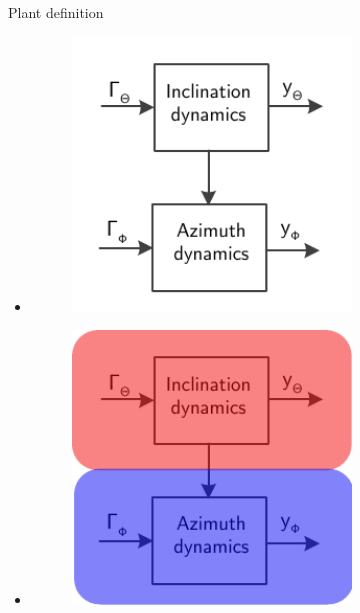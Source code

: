 \documentclass{beamer}
\begin{document}
\begin{frame}{Plant definition}\setlength{\leftmargini}{0pt}
\begin{itemize} 
				\item <1|only@1> [] \begin{figure}[ht]\centering
				\includegraphics[width=0.7\textwidth]{images/Plant.pdf}
			\end{figure}
			\item <2|only@2> [] \begin{figure}[ht]\centering
				\includegraphics[width=0.7\textwidth]{images/Plant2.pdf}
			\end{figure}
\end{itemize}
\end{frame}
\end{document}
